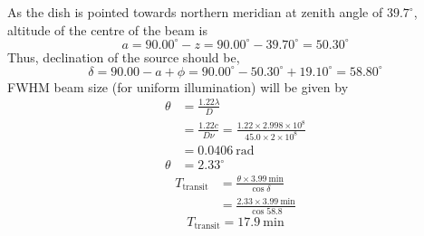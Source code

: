 As the dish is pointed towards northern meridian at zenith angle of
$39.7^\circ$, altitude of the centre of the beam is
\[
a = 90.00^\circ - z = 90.00^\circ - 39.70^\circ = 50.30^\circ \tag*{(1.0)}
\]
Thus, declination of the source should be,
\[
\delta = 90.00 - a + \phi
 = 90.00^\circ - 50.30^\circ + 19.10^\circ = 58.80^\circ \tag*{(2.0)}
\]
FWHM beam size (for uniform illumination) will be given by
\begin{align*}
\theta &= \frac{1.22\lambda}{D} \tag*{(1.5)}\\
&= \frac{1.22c}{D\nu}
 = \frac{1.22 \times 2.998 \times 10^{8}}{45.0 \times 2 \times 10^{8}}\\
&= 0.0406\ \mathrm{rad}\\
\theta &= 2.33^\circ \tag*{(1.5)}
\end{align*}
\begin{align*}
T_{\mathrm{transit}} &= \frac{\theta \times 3.99\ \mathrm{min}}{\cos\delta}
  \tag*{(3.0)}\\
&= \frac{2.33 \times 3.99\ \mathrm{min}}{\cos 58.8}
\end{align*}
\[
\boxed{T_{\mathrm{transit}} = 17.9\ \mathrm{min}} \tag*{(1.0)}
\]
